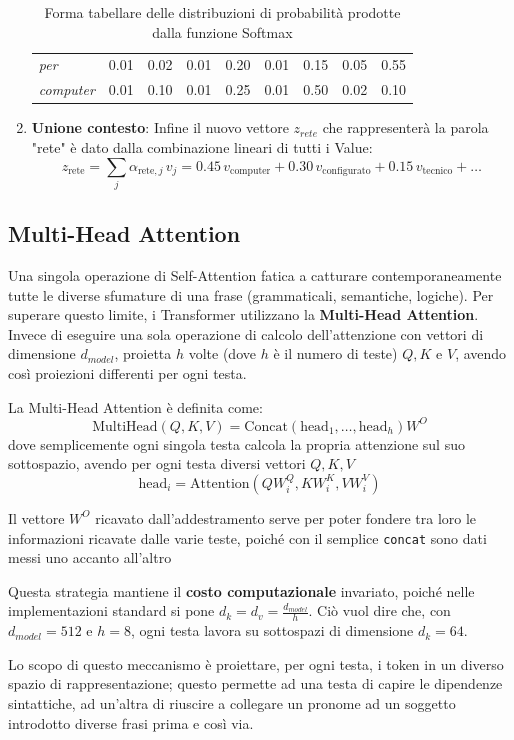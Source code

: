 \documentclass{article}
\begin{document}
\begin{enumerate}
\begin{table}[ht]
\begin{tabular}{lcccccccc}
    \textit{per}         & 0.01 & 0.02 & 0.01 & 0.20 & 0.01 & 0.15 & 0.05 & 0.55 \\
    \textit{computer}    & 0.01 & 0.10 & 0.01 & 0.25 & 0.01 & 0.50 & 0.02 & 0.10 \\
    \bottomrule
    \end{tabular}
    \caption{Forma tabellare delle distribuzioni di probabilità prodotte dalla funzione Softmax}
    \label{tab:attention_matrix}
\end{table}
    \item \textbf{Unione contesto}: Infine il nuovo vettore $z_{rete}$ che rappresenterà la parola "rete" è dato dalla combinazione lineari di tutti i Value: $$z_{\text{rete}} = \sum_{j} \alpha_{\text{rete}, j} \, v_j = 0.45 \, v_{\text{computer}} + 0.30 \, v_{\text{configurato}} + 0.15 \, v_{\text{tecnico}} + \dots$$
\end{enumerate}


\subsection{Multi-Head Attention}
Una singola operazione di Self-Attention fatica a catturare contemporaneamente tutte le diverse sfumature di una frase (grammaticali, semantiche, logiche). Per superare questo limite, i Transformer utilizzano la \textbf{Multi-Head Attention}. 
Invece di eseguire una sola operazione di calcolo dell'attenzione con vettori di dimensione $d_{model}$, proietta $h$ volte (dove $h$ è il numero di teste) $Q,K$ e $V$, avendo così proiezioni differenti per ogni testa.

La Multi-Head Attention è definita come: 
$$\text{MultiHead}(Q, K, V) = \text{Concat}(\text{head}_1, \dots, \text{head}_h) W^O$$
dove semplicemente ogni singola testa calcola la propria attenzione sul suo sottospazio, avendo per ogni testa diversi vettori $Q,K,V$
$$\text{head}_i = \text{Attention}\left(Q W_i^Q, K W_i^K, V W_i^V\right)$$

Il vettore $W^O$ ricavato dall'addestramento serve per poter fondere tra loro le informazioni ricavate dalle varie teste, poiché con il semplice \texttt{concat} sono dati messi uno accanto all'altro

Questa strategia mantiene il \textbf{costo computazionale} invariato, poiché nelle implementazioni standard si pone $d_k = d_v = \frac{d_{model}}{h}$.
Ciò vuol dire che, con $d_{model} = 512$ e $h = 8$, ogni testa lavora su sottospazi di dimensione $d_k = 64$.

Lo scopo di questo meccanismo è proiettare, per ogni testa, i token in un diverso spazio di rappresentazione; questo permette ad una testa di capire le dipendenze sintattiche, ad un'altra di riuscire a collegare un pronome ad un soggetto introdotto diverse frasi prima e così via.
\end{document}
